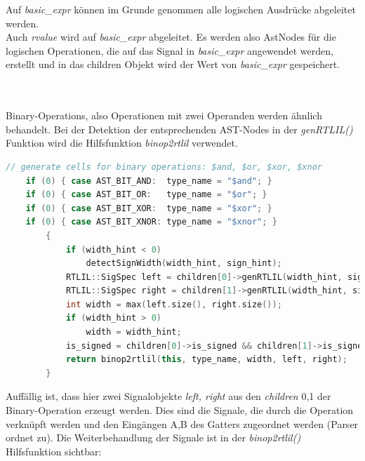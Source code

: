\documentclass[11pt]{report}
\begin{document}
Auf \textit{basic\_expr} können im Grunde genommen alle logischen Ausdrücke abgeleitet werden.\\
Auch \textit{rvalue} wird auf \textit{basic\_expr} abgeleitet.
Es werden also AstNodes für die logischen Operationen, die auf das Signal in \textit{basic\_expr} angewendet werden, erstellt und in das children Objekt wird der Wert von \textit{basic\_expr} gespeichert.

\\
\\
Binary-Operations, also Operationen mit zwei Operanden werden ähnlich behandelt. Bei der Detektion der entsprechenden AST-Nodes in der \textit{genRTLIL()} Funktion wird die Hilfsfunktion \textit{binop2rtlil} verwendet.
\begin{lstlisting}[language=C++]
	// generate cells for binary operations: $and, $or, $xor, $xnor
	if (0) { case AST_BIT_AND:  type_name = "$and"; }
	if (0) { case AST_BIT_OR:   type_name = "$or"; }
	if (0) { case AST_BIT_XOR:  type_name = "$xor"; }
	if (0) { case AST_BIT_XNOR: type_name = "$xnor"; }
		{
			if (width_hint < 0)
				detectSignWidth(width_hint, sign_hint);
			RTLIL::SigSpec left = children[0]->genRTLIL(width_hint, sign_hint);
			RTLIL::SigSpec right = children[1]->genRTLIL(width_hint, sign_hint);
			int width = max(left.size(), right.size());
			if (width_hint > 0)
				width = width_hint;
			is_signed = children[0]->is_signed && children[1]->is_signed;
			return binop2rtlil(this, type_name, width, left, right);
		}
\end{lstlisting}
Auffällig ist, dass hier zwei Signalobjekte \textit{left, right} aus den \textit{children} 0,1 der Binary-Operation erzeugt werden. Dies sind die Signale, die durch die Operation verknüpft werden und den Eingängen A,B des Gatters zugeordnet werden (Parser ordnet zu). Die Weiterbehandlung der Signale ist in der \textit{binop2rtlil()} Hilfsfunktion sichtbar:
\end{document}
